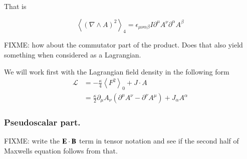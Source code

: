 \documentclass{article}
\newcommand{\LL}[0]{\mathcal{L}}
\newcommand{\gpgrade}[2] {{\left\langle{{#1}}\right\rangle}_{#2}}
\newcommand{\gpgradezero}[1] {\gpgrade{#1}{0}}
\newcommand{\grad}[0]{\nabla}
\begin{document}
That is

\begin{equation}\label{eqn:pseudoscalarFieldSquare}
\gpgrade{ (\grad \wedge A)^2 }{4} = \epsilon_{\mu\nu\alpha\beta} I \partial^{\mu} A^{\nu} \partial^{\alpha} A^{\beta}
\end{equation}

FIXME: how about the commutator part of the product.  Does that also yield something when considered as a Lagrangian.

We will work first with the Lagrangian field density in the following form
\begin{align}\label{eqn:density}
\LL &= -\frac{\kappa}{4} \gpgradezero{F^2} + J \cdot A \\
&= \frac{\kappa}{2} \partial_{\mu} A_{\nu} ( \partial^{\mu} A^{\nu} - \partial^{\nu} A^{\mu} ) + J_{\alpha} A^{\alpha}
\end{align}

%


\subsubsection{ Pseudoscalar part. }

FIXME: write the $\mathbf{E} \cdot \mathbf{B}$ term in tensor notation and see if the second half of Maxwells equation follows from that.
\end{document}
